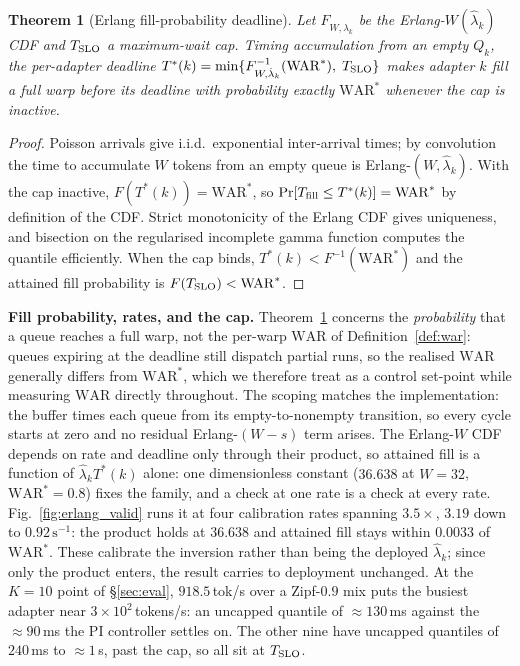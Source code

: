 \documentclass[conference]{IEEEtran}
\newtheorem{theorem}{Theorem}
\newcommand{\war}{\ensuremath{\mathrm{WAR}}\xspace}
\begin{document}
\begin{theorem}[Erlang fill-probability deadline]
\label{thm:erlang}
Let $F_{W,\hat\lambda_k}$ be the Erlang-$W(\hat\lambda_k)$ CDF and $T_{\rm SLO}$ a maximum-wait cap.  Timing accumulation from an empty $Q_k$, the per-adapter deadline
$T^*(k) = \min\{F^{-1}_{W,\hat\lambda_k}(\mathrm{WAR}^*),\;T_{\rm SLO}\}$
makes adapter $k$ fill a full warp before its deadline with probability exactly
$\mathrm{WAR}^*$ whenever the cap is inactive.
\end{theorem}

\begin{proof}
Poisson arrivals give i.i.d.\ exponential inter-arrival times; by convolution the
time to accumulate $W$ tokens from an empty queue is Erlang-$(W,\hat\lambda_k)$.
With the cap inactive, $F(T^*(k)) = \mathrm{WAR}^*$, so
$\Pr[T_{\rm fill} \leq T^*(k)] = \mathrm{WAR}^*$ by definition of the CDF.
Strict monotonicity of the Erlang CDF gives uniqueness, and bisection on the
regularised incomplete gamma function computes the quantile efficiently.
When the cap binds, $T^*(k) < F^{-1}(\mathrm{WAR}^*)$ and the attained fill
probability is $F(T_{\rm SLO}) < \mathrm{WAR}^*$.
\end{proof}

\textbf{Fill probability, rates, and the cap.}
Theorem~\ref{thm:erlang} concerns the \emph{probability} that a queue reaches a
full warp, not the per-warp $\war$ of Definition~\ref{def:war}: queues expiring
at the deadline still dispatch partial runs, so the realised $\war$ generally
differs from $\mathrm{WAR}^*$, which we therefore treat as a control set-point
while measuring $\war$ directly throughout.
The scoping matches the implementation: the buffer times each queue from its
empty-to-nonempty transition, so every cycle starts at zero and no residual
Erlang-$(W{-}s)$ term arises.
The Erlang-$W$ CDF depends on rate and deadline only through their product, so
attained fill is a function of $\hat\lambda_k T^*(k)$ alone: one dimensionless
constant ($36.638$ at $W{=}32$, $\mathrm{WAR}^*{=}0.8$) fixes the family, and a
check at one rate is a check at every rate.  Fig.~\ref{fig:erlang_valid} runs it
at four calibration rates spanning $3.5{\times}$, $3.19$ down to
$0.92\,\mathrm{s}^{-1}$: the product holds at $36.638$ and attained fill stays
within $0.0033$ of $\mathrm{WAR}^*$.  These calibrate the inversion rather than
being the deployed $\hat\lambda_k$; since only the product enters, the result
carries to deployment unchanged.  At the $K{=}10$ point of
\S\ref{sec:eval}, $918.5$\,tok/s over a Zipf-$0.9$ mix puts the busiest adapter
near $3{\times}10^{2}$\,tokens/s: an uncapped quantile of ${\approx}130$\,ms
against the ${\approx}90$\,ms the PI controller settles on.  The other nine have
uncapped quantiles of $240$\,ms to ${\approx}1$\,s, past the cap, so all sit at
$T_{\rm SLO}$.
\end{document}
